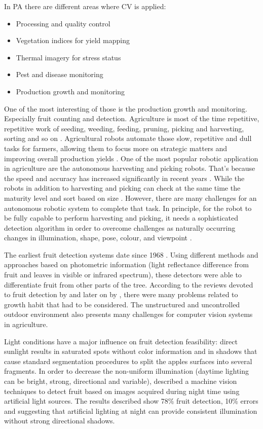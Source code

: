 \documentclass[review]{elsarticle}
\begin{document}
    In PA there are different areas where CV is applied:

    \begin{itemize}
        \item Processing and quality control
        \item Vegetation indices for yield mapping
        \item Thermal imagery for stress status
        \item Pest and disease monitoring
        \item Production growth and monitoring
    \end{itemize}

    One of the most interesting of those is the production growth and monitoring. Especially fruit counting and detection. Agriculture is most of the time repetitive, repetitive work of seeding, weeding, feeding, pruning, picking and harvesting, sorting and so on \cite{He_2018}. Agricultural robots automate those slow, repetitive and dull tasks for farmers, allowing them to focus more on strategic matters and improving overall production yields \cite{Edan_2009}. One of the most popular robotic application in agriculture are the autonomous harvesting and picking robots. That’s because the speed and accuracy has increased significantly in recent years \cite{Tao_2017, Bechar_2016}. While the robots in addition to harvesting and picking can check at the same time the maturity level and sort based on size \cite{Edan_2009}. However, there are many challenges for an autonomous robotic system to complete that task. In principle, for the robot to be fully capable to perform harvesting and picking, it needs a sophisticated detection algorithm in order to overcome challenges as naturally occurring changes in illumination, shape, pose, colour, and viewpoint \cite{Barnea_2016}.

    The earliest fruit detection systems date since 1968 \cite{Jimnez1999}. Using different methods and approaches based on photometric information (light reflectance difference from fruit and leaves in visible or infrared spectrum), these detectors were able to differentiate fruit from other parts of the tree. According to the reviews devoted to fruit detection by \cite{Jimnez1999} and later on by \cite{Kapach_2012}, there were many problems related to growth habit that had to be considered. The unstructured and uncontrolled outdoor environment also presents many challenges for computer vision systems in agriculture.

    Light conditions have a major influence on fruit detection feasibility: direct sunlight results in saturated spots without color information and in shadows that cause standard segmentation procedures to split the apples surfaces into several fragments. In order to decrease the non-uniform illumination (daytime lighting can be bright, strong, directional and variable), \cite{Payne_2014} described a machine vision techniques to detect fruit based on images acquired during night time using artificial light sources. The results described show 78\% fruit detection, 10\% errors and suggesting that artificial lighting at night can provide consistent illumination without strong directional shadows.
\end{document}
